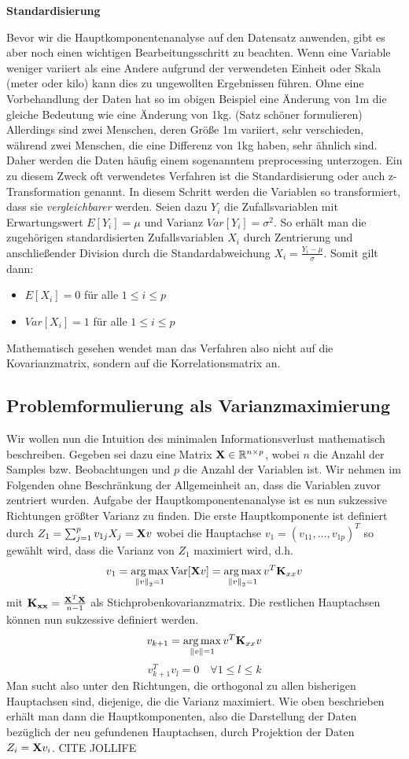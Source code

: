 \textbf{Standardisierung}

Bevor wir die Hauptkomponentenanalyse auf den Datensatz anwenden, gibt es aber noch einen wichtigen Bearbeitungsschritt zu beachten. Wenn eine Variable weniger variiert als eine Andere aufgrund der verwendeten Einheit oder Skala (meter oder kilo) kann dies zu ungewollten Ergebnissen führen. Ohne eine Vorbehandlung der Daten hat so im obigen Beispiel eine Änderung von 1m die gleiche Bedeutung wie eine Änderung von 1kg. (Satz schöner formulieren) Allerdings sind zwei Menschen, deren Größe 1m variiert, sehr verschieden, während zwei Menschen, die eine Differenz von 1kg haben, sehr ähnlich sind. Daher werden die Daten häufig einem sogenanntem preprocessing unterzogen. Ein zu diesem Zweck oft verwendetes Verfahren ist die Standardisierung oder auch z-Transformation genannt. In diesem Schritt werden die Variablen so transformiert, dass sie \textit{vergleichbarer} werden. Seien dazu $Y_i$ die Zufallsvariablen mit Erwartungswert $E[Y_i] = \mu$ und Varianz $Var[Y_i] = \sigma^2$. So erhält man die zugehörigen standardisierten Zufallsvariablen $X_i$ durch Zentrierung und anschließender Division durch die Standardabweichung $X_i = \frac{Y_i - \mu}{\sigma}$. Somit gilt dann:
\begin{itemize}
\item $E[X_i] = 0$ für alle $1 \leq i \leq p$
\item $Var[X_i] = 1$ für alle $1 \leq i \leq p$
\end{itemize}

Mathematisch gesehen wendet man das Verfahren also nicht auf die Kovarianzmatrix, sondern auf die Korrelationsmatrix an.

\subsection{Problemformulierung als Varianzmaximierung}

Wir wollen nun die Intuition des minimalen Informationsverlust mathematisch beschreiben. Gegeben sei dazu eine Matrix $\mathbf{X} \in \mathbb{R}^{n\times p}$, wobei $n$ die Anzahl der Samples bzw. Beobachtungen und $p$ die Anzahl der Variablen ist. Wir nehmen im Folgenden ohne Beschränkung der Allgemeinheit an, dass die Variablen zuvor zentriert wurden. Aufgabe der Hauptkomponentenanalyse ist es nun sukzessive Richtungen größter Varianz zu finden. Die erste Hauptkomponente ist definiert durch $Z_1 = \sum_{j=1}^p v_{1j}X_j = \mathbf{X}v$ wobei die Hauptachse $v_1 = (v_{11}, \ldots, v_{1p})^T$ so gewählt wird, dass die Varianz von $Z_1$ maximiert wird, d.h.
$$v_1 = \operatorname*{arg\,max}_{\left\lVert v \right\rVert_2 = 1} \text{Var}[\mathbf{X}v] = \operatorname*{arg\,max}_{\left\lVert v \right\rVert_2 = 1} v^T \mathbf{K}_{xx} v$$
mit $\mathbf{K_{xx}} = \frac{\mathbf{X}^T\mathbf{X}}{n-1}$ als Stichprobenkovarianzmatrix. Die restlichen Hauptachsen können nun sukzessive definiert werden.
$$v_{k+1} = \operatorname*{arg\,max}_{\left\lVert v \right\rVert = 1} v^T \mathbf{K}_{xx} v$$ 
$$v_{k+1}^Tv_l = 0 \quad \forall 1 \leq l \leq k$$
Man sucht also unter den Richtungen, die orthogonal zu allen bisherigen Hauptachsen sind, diejenige, die die Varianz maximiert. Wie oben beschrieben erhält man dann die Hauptkomponenten, also die Darstellung der Daten bezüglich der neu gefundenen Hauptachsen, durch Projektion der Daten $Z_i = \mathbf{X}v_i$.
\cite{zou_overview}
CITE JOLLIFE

